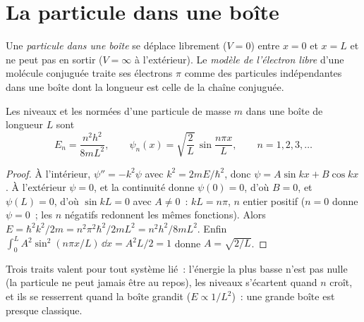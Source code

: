 \section{La particule dans une boîte}

\begin{definition}\label{def:b3:quantum-model-systems:box}
Une \emph{particule dans une boîte} se déplace librement ($V = 0$)
entre $x = 0$ et $x = L$ et ne peut pas en sortir ($V = \infty$ à
l'extérieur). Le \emph{modèle de l'électron libre} d'une
molécule conjuguée traite ses électrons $\pi$ comme des particules
indépendantes dans une boîte dont la longueur est celle de la chaîne
conjuguée.
\end{definition}

\begin{theorem}\label{thm:b3:quantum-model-systems:box}
Les niveaux et les  normées d'une particule de masse $m$
dans une boîte de longueur $L$ sont
\[
E_n = \frac{n^2h^2}{8mL^2}, \qquad \psi_n(x) = \sqrt{\frac2L}\,\sin\frac{n\pi
x}{L}, \qquad n = 1, 2, 3, \dots
\]
\end{theorem}

\begin{proof}
À l'intérieur, $\psi'' = -k^2\psi$ avec $k^2 = 2mE/\hbar^2$, donc $\psi = A\sin kx +
B\cos kx$. À l'extérieur $\psi = 0$, et la continuité donne $\psi(0) = 0$,
d'où $B =
0$, et $\psi(L) = 0$, d'où $\sin kL = 0$ avec $A \ne 0$~: $kL = n\pi$, $n$
entier positif ($n = 0$ donne $\psi = 0$~; les $n$ négatifs redonnent les
mêmes fonctions). Alors $E = \hbar^2k^2/2m = n^2\pi^2\hbar^2/2mL^2 = n^2h^2/8mL^2$.
Enfin $\int_0^L A^2\sin^2(n\pi x/L)\,\dd x = A^2L/2 = 1$ donne $A =
\sqrt{2/L}$.
\end{proof}

Trois traits valent pour tout système lié~: l'énergie la plus basse n'est
pas nulle (la particule ne peut jamais être au repos), les niveaux
s'écartent quand $n$ croît, et ils se resserrent quand la boîte grandit
($E \propto 1/L^2$)~: une grande boîte est presque classique.

